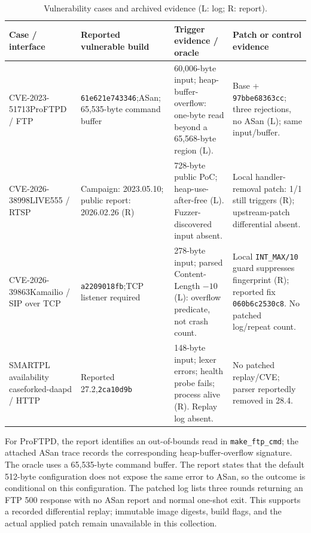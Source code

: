 \begin{table}[!tbp]
\centering\small
\caption{Vulnerability cases and archived evidence (L: log; R: report).}
\label{tab:cve}
\begin{tabularx}{\textwidth}{@{}>{\raggedright\arraybackslash}p{} >{\raggedright\arraybackslash}p{} Y Y@{}}
\toprule
Case / interface & Reported vulnerable build & Trigger evidence / oracle & Patch or control evidence \\
\midrule
\mbox{CVE-2023-51713}\newline ProFTPD / FTP & \texttt{61e621e743346};\newline ASan; 65,535-byte command buffer & 60,006-byte input; heap-buffer-overflow: one-byte read beyond a 65,568-byte region (L). & Base + \texttt{97bbe68363cc}; three rejections, no ASan (L); same input/buffer. \\
\addlinespace[3pt]
\mbox{CVE-2026-38998}\newline LIVE555 / RTSP & Campaign: 2023.05.10; public report: 2026.02.26 (R) & 728-byte public PoC; heap-use-after-free (L). Fuzzer-discovered input absent. & Local handler-removal patch: 1/1 still triggers (R); upstream-patch differential absent. \\
\addlinespace[3pt]
\mbox{CVE-2026-39863}\newline Kamailio / SIP over TCP & \texttt{a2209018fb};\newline TCP listener required & 278-byte input; parsed Content-Length $-10$ (L): overflow predicate, not crash count. & Local \texttt{INT\_MAX/10} guard suppresses fingerprint (R); reported fix \texttt{060b6c2530c8}. No patched log/repeat count. \\
\addlinespace[3pt]
SMARTPL availability case\newline forked-daapd / HTTP & Reported 27.2,\newline \texttt{2ca10d9b} & 148-byte input; lexer errors; health probe fails; process alive (R). Replay log absent. & No patched replay/CVE; parser reportedly removed in 28.4. \\
\bottomrule
\end{tabularx}
\end{table}

For ProFTPD, the report identifies an out-of-bounds read in \texttt{make\_ftp\_cmd}; the attached ASan trace records the corresponding heap-buffer-overflow signature. The oracle uses a 65,535-byte command buffer. The report states that the default 512-byte configuration does not expose the same error to ASan, so the outcome is conditional on this configuration. The patched log lists three rounds returning an FTP 500 response with no ASan report and normal one-shot exit. This supports a recorded differential replay; immutable image digests, build flags, and the actual applied patch remain unavailable in this collection.

